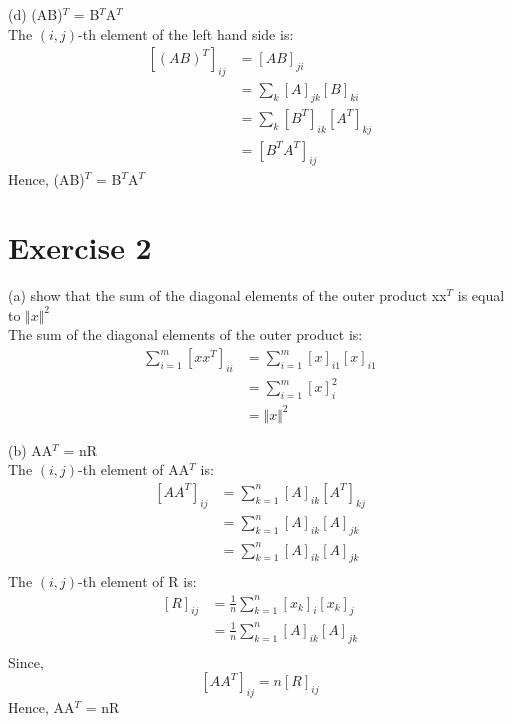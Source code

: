 \documentclass{article}
\begin{document}
\noindent
(d) (AB)$^T$ = B$^T$A$^T$\\
The $(i,j)$-th element of the left hand side is:\\
\begin{equation}
    \begin{aligned}
        [(AB)^T]_{ij} & = [AB]_{ji}\\
        & = \sum\limits_{k}[A]_{jk}[B]_{ki}\\
        & = \sum\limits_{k}[B^T]_{ik}[A^T]_{kj}\\
        & = [B^TA^T]_{ij}
    \end{aligned}
\end{equation}  
Hence, (AB)$^T$ = B$^T$A$^T$

\section{Exercise 2}
(a) show that the sum of the diagonal elements of the outer product xx$^T$ is equal to ${\Vert x \Vert}^2$\\
The sum of the diagonal elements of the outer product is:\\
\begin{equation}
    \begin{aligned}
        \sum\limits_{i=1}^m [xx^T]_{ii} & = \sum\limits_{i=1}^m [x]_{i1}[x]_{i1}\\
        & = \sum\limits_{i=1}^m [x]_{i}^2\\
        & = {\Vert x \Vert}^2
    \end{aligned}
\end{equation} 

\noindent
(b) AA$^T$ = nR\\
The $(i,j)$-th element of AA$^T$ is:\\
\begin{equation}
    \begin{aligned}
        [AA^T]_{ij} & = \sum\limits_{k=1}^n [A]_{ik} [A^T]_{kj}\\
        & = \sum\limits_{k=1}^n [A]_{ik} [A]_{jk}\\
        & = \sum\limits_{k=1}^n [A]_{ik} [A]_{jk}\\
    \end{aligned}
\end{equation} 
The $(i,j)$-th element of R is:\\
\begin{equation}
    \begin{aligned}
        [R]_{ij} & = \frac{1}{n}\sum\limits_{k=1}^n [x_k]_{i} [x_k]_{j}\\
        & = \frac{1}{n}\sum\limits_{k=1}^n [A]_{ik} [A]_{jk}\\
    \end{aligned}
\end{equation}
\noindent
Since, $$[AA^T]_{ij} = n[R]_{ij}$$
Hence, AA$^T$ = nR\\
\end{document}
